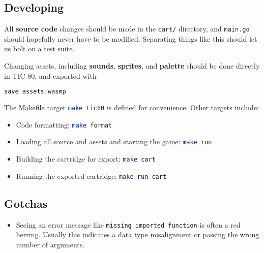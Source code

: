\documentclass{article}
\begin{document}
\subsection{Developing}

\noindent All \textbf{source code} changes should be made in the \lstinline|cart/| directory, and \lstinline[language=Bash]|main.go| should hopefully never have to be modified. Separating things like this should let us bolt on a test suite.

Changing assets, including \textbf{sounds}, \textbf{sprites}, and \textbf{palette} should be done directly in TIC-80, and exported with
\\
\begin{lstlisting}[language=Bash]
save assets.wasmp
\end{lstlisting}

\noindent The Makefile target \lstinline[language=Bash]|make tic80| is defined for convenience. Other targets include:

\noindent

\begin{itemize}
    \item Code formatting: \lstinline[language=Bash]|make format|
    \item Loading all source and assets and starting the game: \lstinline[language=Bash]|make run|
    \item Building the cartridge for export: \lstinline[language=Bash]|make cart|
    \item Running the exported cartridge: \lstinline[language=Bash]|make run-cart|
\end{itemize}

\subsection{Gotchas}

\begin{itemize}
    \item Seeing an error message like \lstinline|missing imported function| is often a red herring. Usually this indicates a data type misalignment or passing the wrong number of arguments.
\end{itemize}
\end{document}
